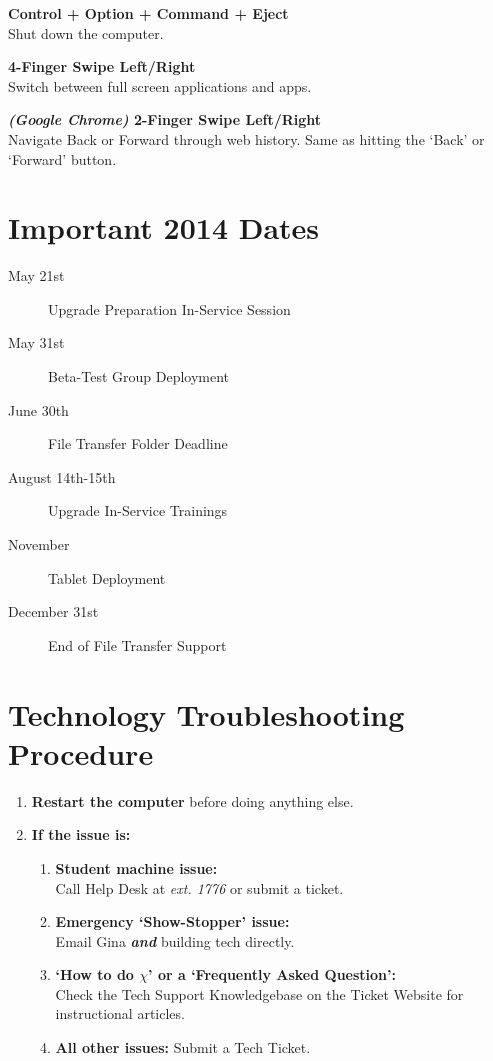 \documentclass[10pt,foldmark,notumble]{leaflet}
\begin{document}
\textbf{Control + Option + Command + Eject}\\
Shut down the computer.

\textbf{4-Finger Swipe Left/Right}\\
Switch between full screen applications and apps.

\textbf{\emph{(Google Chrome)} 2-Finger Swipe Left/Right}\\
Navigate Back or Forward through web history. Same as hitting the `Back' or `Forward' button.

\section{Important 2014 Dates\color{red}\hrulefill\color{black}}
\begin{description}
\item[May 21st] \dotfill Upgrade Preparation In-Service Session
\item[May 31st] \dotfill Beta-Test Group Deployment
\item[June 30th] \dotfill File Transfer Folder Deadline
\item[August 14th-15th] \dotfill Upgrade In-Service Trainings
\item[November] \dotfill Tablet Deployment
\item[December 31st] \dotfill End of File Transfer Support
\end{description}

\section{Technology Troubleshooting Procedure\color{red}\hrulefill\color{black}}
\begin{enumerate}
\item \textbf{Restart the computer} before doing anything else.
\item \textbf{If the issue is:}
\begin{enumerate}
\item \textbf{Student machine issue:}\\Call Help Desk at \emph{ext. 1776} or submit a ticket.
\item \textbf{Emergency `Show-Stopper' issue:}\\Email Gina \textbf{\emph{and}} building tech directly.
\item \textbf{`How to do $\chi$' or a `Frequently Asked Question':}\\Check the Tech Support Knowledgebase on the Ticket Website for instructional articles.
\item \textbf{All other issues:} Submit a Tech Ticket.
\end{enumerate}
\end{enumerate}
\end{document}
